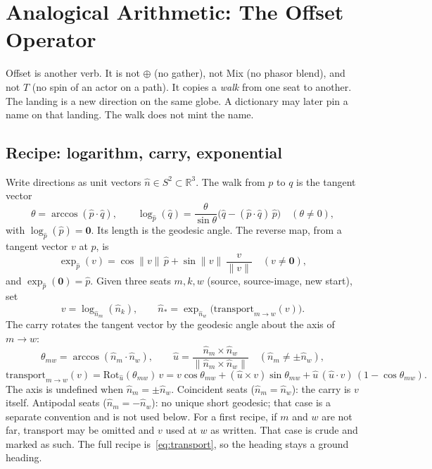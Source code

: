\documentclass[12pt, a4paper]{article}
\begin{document}
\section{Analogical Arithmetic: The Offset Operator}
\label{sec:analogical_offset}

Offset is another verb. It is not $\oplus$ (no gather), not Mix
(no phasor blend), and not $T$
(no spin of an actor on a path). It copies a \emph{walk} from one
seat to another. The landing is a new direction on the same globe.
A dictionary may later pin a name on that landing. The walk does
not mint the name.

\subsection{Recipe: logarithm, carry, exponential}
\label{subsec:offset_logexp}
Write directions as unit vectors $\hat n\in S^2\subset\mathbb{R}^3$.
The walk from $p$ to $q$ is the tangent vector
\begin{equation}
    \theta = \arccos(\hat p\cdot\hat q),
    \qquad
    \log_{\hat p}(\hat q)
    = \frac{\theta}{\sin\theta}\bigl(\hat q-(\hat p\cdot\hat q)\,\hat p\bigr)
    \quad (\theta\neq 0),
    \label{eq:sphere_log}
\end{equation}
with $\log_{\hat p}(\hat p)=\mathbf{0}$. Its length is the geodesic
angle. The reverse map, from a tangent vector $v$ at $p$, is
\begin{equation}
    \exp_{\hat p}(v)
    = \cos\|v\|\,\hat p + \sin\|v\|\,\frac{v}{\|v\|}
    \quad (v\neq\mathbf{0}),
    \label{eq:sphere_exp}
\end{equation}
and $\exp_{\hat p}(\mathbf{0})=\hat p$. Given three seats
$m,k,w$ (source, source-image, new start), set
\begin{equation}
    v = \log_{\hat n_m}(\hat n_k),
    \qquad
    \hat n_{*}
    = \exp_{\hat n_w}\bigl(\mathrm{transport}_{m\to w}(v)\bigr).
    \label{eq:analogical_offset}
\end{equation}
The carry rotates the tangent vector by the geodesic angle about the
axis of $m\to w$:
\begin{equation}
    \theta_{mw} = \arccos(\hat n_m\cdot\hat n_w),
    \qquad
    \hat u
    = \frac{\hat n_m\times\hat n_w}{\|\hat n_m\times\hat n_w\|}
    \quad (\hat n_m\neq\pm\hat n_w),
    \label{eq:transport_axis}
\end{equation}
\begin{equation}
    \mathrm{transport}_{m\to w}(v)
    = \mathrm{Rot}_{\hat u}(\theta_{mw})\, v
    = v\cos\theta_{mw}
      + (\hat u\times v)\sin\theta_{mw}
      + \hat u\,(\hat u\cdot v)\,(1-\cos\theta_{mw}).
    \label{eq:transport}
\end{equation}
The axis is undefined when $\hat n_m=\pm\hat n_w$.
Coincident seats ($\hat n_m=\hat n_w$): the carry is $v$ itself.
Antipodal seats ($\hat n_m=-\hat n_w$): no unique short geodesic;
that case is a separate convention and is not used below.
For a first recipe, if $m$ and $w$ are not far, transport may be
omitted and $v$ used at $w$ as written. That case is crude and
marked as such. The full recipe is~\eqref{eq:transport}, so the
heading stays a ground heading.
\end{document}
